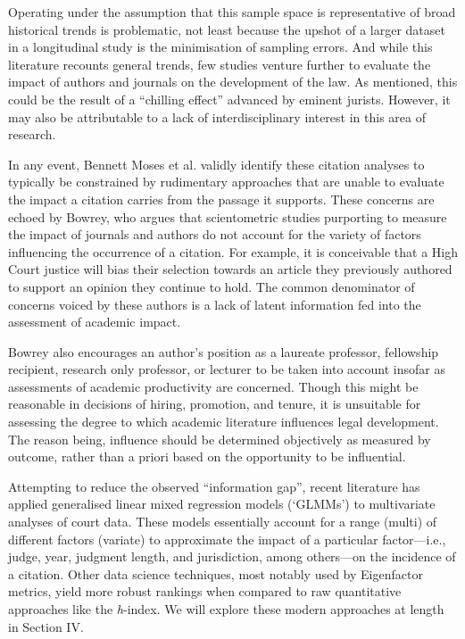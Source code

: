 Operating under the assumption that this sample space is representative of broad historical trends is problematic, not least because the upshot of a larger dataset in a longitudinal study is the minimisation of sampling errors. And while this literature recounts general trends, few studies venture further to evaluate the impact of authors and journals on the development of the law. As mentioned, this could be the result of a ``chilling effect'' advanced by eminent jurists. However, it may also be attributable to a lack of interdisciplinary interest in this area of research.

In any event, Bennett Moses et al. validly identify these citation analyses to typically be constrained by rudimentary approaches that are unable to evaluate the impact a citation carries from the passage it supports. These concerns are echoed by Bowrey, who argues that scientometric studies purporting to measure the impact of journals and authors do not account for the variety of factors influencing the occurrence of a citation. For example, it is conceivable that a High Court justice will bias their selection towards an article they previously authored to support an opinion they continue to hold. The common denominator of concerns voiced by these authors is a lack of latent information fed into the assessment of academic impact.

Bowrey also encourages an author's position as a laureate professor, fellowship recipient, research only professor, or lecturer to be taken into account insofar as assessments of academic productivity are concerned. Though this might be reasonable in decisions of hiring, promotion, and tenure, it is unsuitable for assessing the degree to which academic literature influences legal development. The reason being, influence should be determined objectively as measured by outcome, rather than a priori based on the opportunity to be influential.

Attempting to reduce the observed ``information gap'', recent literature has applied generalised linear mixed regression models (`GLMMs') to multivariate analyses of court data. These models essentially account for a range (multi) of different factors (variate) to approximate the impact of a particular factor---i.e., judge, year, judgment length, and jurisdiction, among others---on the incidence of a citation. Other data science techniques, most notably used by Eigenfactor metrics, yield more robust rankings when compared to raw quantitative approaches like the \textit{h}-index. We will explore these modern approaches at length in Section IV.
